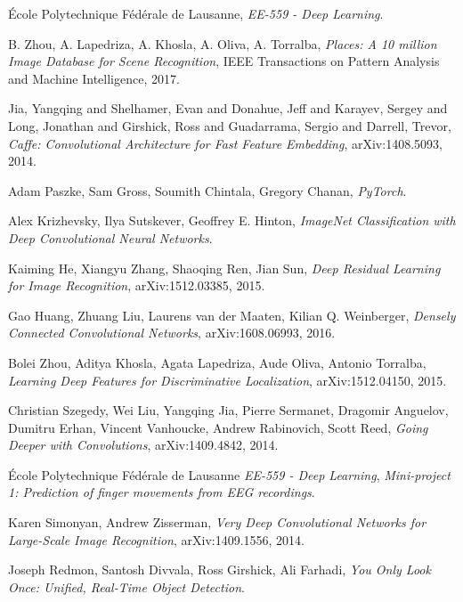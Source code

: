\begin{thebibliography}{}

	École Polytechnique Fédérale de Lausanne,
	\emph{EE-559 - Deep Learning}.

	B. Zhou, A. Lapedriza, A. Khosla, A. Oliva, A. Torralba,
	\emph{Places: A 10 million Image Database for Scene Recognition},
    IEEE Transactions on Pattern Analysis and Machine Intelligence, 2017.

	Jia, Yangqing and Shelhamer, Evan and Donahue, Jeff and Karayev, Sergey and Long, Jonathan and Girshick, Ross and Guadarrama, Sergio and Darrell, Trevor,
	\emph{Caffe: Convolutional Architecture for Fast Feature Embedding},
    arXiv:1408.5093, 2014.

    Adam Paszke, Sam Gross, Soumith Chintala, Gregory Chanan,
    \emph{PyTorch}.

	Alex Krizhevsky, Ilya Sutskever, Geoffrey E. Hinton,
    \emph{ImageNet Classification with Deep Convolutional Neural Networks}.

	Kaiming He, Xiangyu Zhang, Shaoqing Ren, Jian Sun,
	\emph{Deep Residual Learning for Image Recognition},
    arXiv:1512.03385, 2015.

	Gao Huang, Zhuang Liu, Laurens van der Maaten, Kilian Q. Weinberger,
    \emph{Densely Connected Convolutional Networks},
    arXiv:1608.06993, 2016.

	Bolei Zhou, Aditya Khosla, Agata Lapedriza, Aude Oliva, Antonio Torralba,
	\emph{Learning Deep Features for Discriminative Localization},
	arXiv:1512.04150, 2015.

	Christian Szegedy, Wei Liu, Yangqing Jia, Pierre Sermanet, Dragomir Anguelov, Dumitru Erhan, Vincent Vanhoucke, Andrew Rabinovich, Scott Reed,
	\emph{Going Deeper with Convolutions},
	arXiv:1409.4842, 2014.


	École Polytechnique Fédérale de Lausanne
	\emph{EE-559 - Deep Learning},
	\emph{Mini-project 1: Prediction of finger movements from EEG recordings}.

	Karen Simonyan, Andrew Zisserman,
    \emph{Very Deep Convolutional Networks for Large-Scale Image Recognition},
    arXiv:1409.1556, 2014.

    Joseph Redmon, Santosh Divvala, Ross Girshick, Ali Farhadi,
    \emph{You Only Look Once: Unified, Real-Time Object Detection}.


\end{thebibliography}
